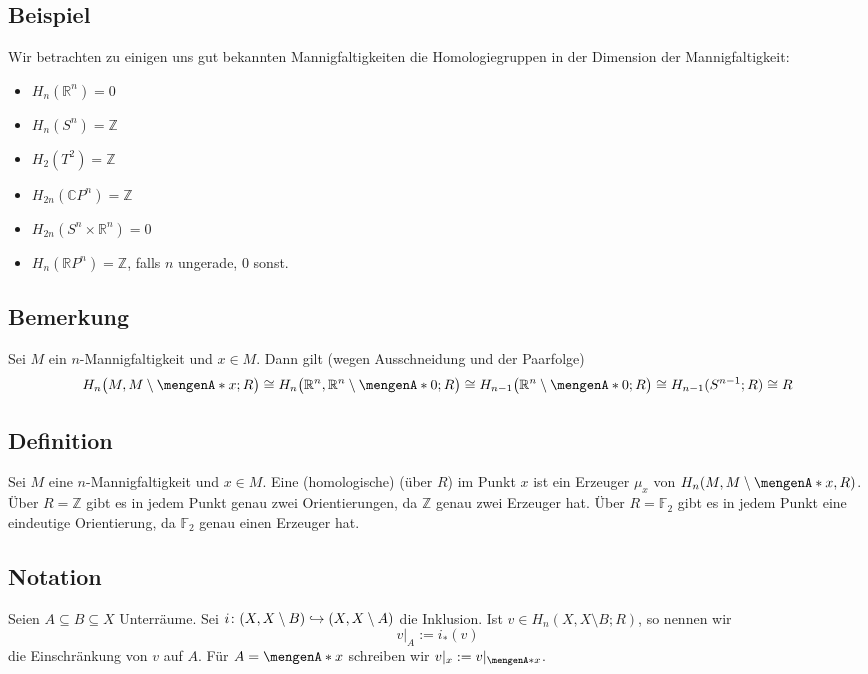 \subsection[Beispiele für die Homologiegruppen verschiedener Mannigfaltigkeiten]{Beispiel} %
\label{sub:161}
Wir betrachten zu einigen uns gut bekannten Mannigfaltigkeiten die Homologiegruppen in der Dimension der Mannigfaltigkeit:
\begin{multicols}{2}
	\begin{itemize}
		\item $H_n(\mathds{R}^n)=0$
		\item $H_n(S^n)=\mathds{Z}$
		\item $H_2(T^2)=\mathds{Z}$
		\item $H_{2n}(\mathds{C}P^n)=\mathds{Z}$
		\item $H_{2n}(S^n \times \mathds{R}^n)=0$
		\item $H_n(\mathds{R}P^n)=\mathds{Z}$, falls $n$ ungerade, $0$ sonst.
	\end{itemize}
\end{multicols}

\subsection{Bemerkung} %
\label{sub:162}
Sei $M$ ein $n$-Mannigfaltigkeit und $x \in M$. Dann gilt (wegen Ausschneidung und der Paarfolge)
\[
	H_n\enbrace[\big]{M, M\setminus \set{x};R} \cong H_n \enbrace[\big]{\mathds{R}^n,  \mathds{R}^n \setminus \set{0};R} \cong H_{n-1}\enbrace[\big]{\mathds{R}^n \setminus 
	\set{0};R} \cong H_{n-1}(S^{n-1};R)\cong R
\]

\subsection[Definition: Homologische Orientierung]{Definition} %
\label{sub:163}
Sei $M$ eine $n$-Mannigfaltigkeit und $x \in M$. Eine (homologische)  (über $R$) im Punkt $x$ ist ein Erzeuger $\mu_x$ von $H_n(M,M\setminus \set{x},R)$.
Über $R=\mathds{Z}$ gibt es in jedem Punkt genau zwei Orientierungen, da $\mathds{Z}$ genau zwei Erzeuger hat. Über $R=\mathds{F}_2$ gibt es in jedem Punkt eine eindeutige
Orientierung, da $\mathds{F}_2$ genau einen Erzeuger hat.

\subsection{Notation} %
\label{sub:164}
Seien $A \subseteq B \subseteq X$ Unterräume. Sei $i\colon (X,X\setminus B) \hookrightarrow \enbrace*{X,X\setminus A}$ die Inklusion. Ist $v\in H_n(X,X\setminus B;R)$, so
nennen wir 
\[
	v\big|_A := i_*(v)
\]
die Einschränkung von $v$ auf $A$. Für $A=\set{x}$ schreiben wir $v|_x := v|_{\set{x}}$.

